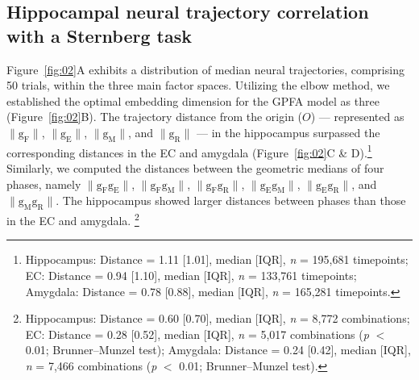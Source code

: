 \documentclass[final,3p,times,twocolumn]{elsarticle}
\begin{document}
\subsection{Hippocampal neural trajectory correlation with a Sternberg task}
Figure~\ref{fig:02}A exhibits a distribution of median neural trajectories, comprising 50 trials, within the three main factor spaces. Utilizing the elbow method, we established the optimal embedding dimension for the GPFA model as three (Figure~\ref{fig:02}B). The trajectory distance from the origin ($O$) --- represented as $\mathrm{\lVert g_{F} \rVert}$, $\mathrm{\lVert g_{E} \rVert}$, $\mathrm{\lVert g_{M} \rVert}$, and $\mathrm{\lVert g_{R} \rVert}$ --- in the hippocampus surpassed the corresponding distances in the EC and amygdala (Figure~\ref{fig:02}C \& D).\footnote{Hippocampus: Distance = 1.11 [1.01], median [IQR], \textit{n} = 195,681 timepoints; EC: Distance = 0.94 [1.10], median [IQR], \textit{n} = 133,761 timepoints; Amygdala: Distance = 0.78 [0.88], median [IQR], \textit{n} = 165,281 timepoints.}
\\
\indent
Similarly, we computed the distances between the geometric medians of four phases, namely $\mathrm{\lVert g_{F}g_{E} \rVert}$, $\mathrm{\lVert g_{F}g_{M} \rVert}$, $\mathrm{\lVert g_{F}g_{R} \rVert}$, $\mathrm{\lVert g_{E}g_{M} \rVert}$, $\mathrm{\lVert g_{E}g_{R} \rVert}$, and $\mathrm{\lVert g_{M}g_{R} \rVert}$. The hippocampus showed larger distances between phases than those in the EC and amygdala. \footnote{Hippocampus: Distance = 0.60 [0.70], median [IQR], \textit{n} = 8,772 combinations; EC: Distance = 0.28 [0.52], median [IQR], \textit{n} = 5,017 combinations (\textit{p} $<$ 0.01; Brunner--Munzel test); Amygdala: Distance = 0.24 [0.42], median [IQR], \textit{n} = 7,466 combinations (\textit{p} $<$ 0.01; Brunner--Munzel test).}
\end{document}

